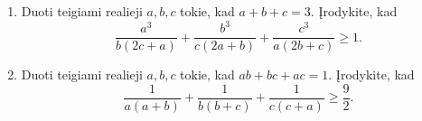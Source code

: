 \begin{enumerate}
  \item Duoti teigiami realieji $a,b,c$ tokie, kad $a+b+c=3$. Įrodykite,
    kad
    $$\frac{a^3}{b(2c+a)}+\frac{b^3}{c(2a+b)}+\frac{c^3}{a(2b+c)}\geq1.$$
  \item Duoti teigiami realieji $a,b,c$ tokie, kad $ab+bc+ac=1$. Įrodykite,
    kad
    $$\frac{1}{a(a+b)}+\frac{1}{b(b+c)}+\frac{1}{c(c+a)}\geq\frac{9}{2}.$$

\end{enumerate}
